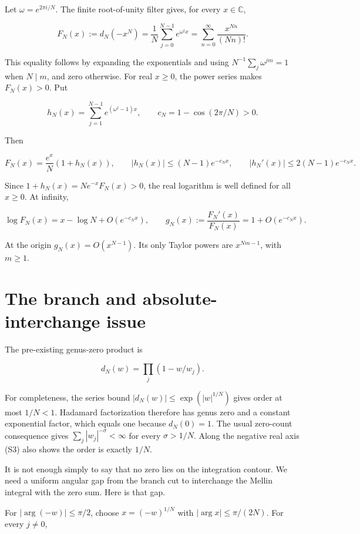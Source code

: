 Let \(\omega=e^{2\pi i/N}\). The finite root-of-unity filter gives, for
every \(x\in\mathbb C\),

\[
F_N(x):=d_N(-x^N)
=\frac1N\sum_{j=0}^{N-1}e^{\omega^j x}
=\sum_{n=0}^{\infty}\frac{x^{Nn}}{(Nn)!}.
\tag{S1}
\]

This equality follows by expanding the exponentials and using
\(N^{-1}\sum_j\omega^{jm}=1\) when \(N\mid m\), and zero otherwise. For
real \(x\ge0\), the power series makes \(F_N(x)>0\). Put

\[
h_N(x)=\sum_{j=1}^{N-1}e^{(\omega^j-1)x},
\qquad c_N=1-\cos(2\pi/N)>0.
\]

Then

\[
F_N(x)=\frac{e^x}{N}(1+h_N(x)),\qquad
|h_N(x)|\le(N-1)e^{-c_Nx},\qquad
|h_N'(x)|\le2(N-1)e^{-c_Nx}.
\tag{S2}
\]

Since \(1+h_N(x)=Ne^{-x}F_N(x)>0\), the real logarithm is well defined
for all \(x\ge0\). At infinity,

\[
\log F_N(x)=x-\log N+O(e^{-c_Nx}),
\qquad g_N(x):=\frac{F_N'(x)}{F_N(x)}
=1+O(e^{-c_Nx}).
\tag{S3}
\]

At the origin \(g_N(x)=O(x^{N-1})\). Its only Taylor powers are
\(x^{Nm-1}\), with \(m\ge1\).

\hypertarget{the-branch-and-absolute-interchange-issue}{%
\section{The branch and absolute-interchange
issue}\label{the-branch-and-absolute-interchange-issue}}

The pre-existing genus-zero product is

\[
d_N(w)=\prod_j(1-w/w_j).
\tag{S4}
\]

For completeness, the series bound \(|d_N(w)|\le\exp(|w|^{1/N})\) gives
order at most \(1/N<1\). Hadamard factorization therefore has genus zero
and a constant exponential factor, which equals one because
\(d_N(0)=1\). The usual zero-count consequence gives
\(\sum_j|w_j|^{-\sigma}<\infty\) for every \(\sigma>1/N\). Along the
negative real axis (S3) also shows the order is exactly \(1/N\).

It is not enough simply to say that no zero lies on the integration
contour. We need a uniform angular gap from the branch cut to
interchange the Mellin integral with the zero sum. Here is that gap.

For \(|\arg(-w)|\le\pi/2\), choose \(x=(-w)^{1/N}\) with
\(|\arg x|\le\pi/(2N)\). For every \(j\ne0\),

